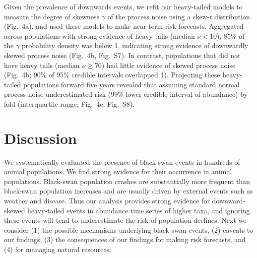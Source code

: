 \documentclass[9pt,twocolumn,twoside]{pnas-new}
\newcommand{\figskewnu}{{7}}
\newcommand{\figskewprojections}{{8}}
\begin{document}
Given the prevalence of downwards events, we refit our heavy-tailed models to
measure the degree of skewness \(\gamma\) of the process noise using a skew-$t$
distribution (Fig.~4a), and used these models to make near-term risk forecasts.
Aggregated across populations with strong evidence of heavy tails (median \(\nu
< 10\)), 85\% of the \(\gamma\) probability density was below 1, indicating
strong evidence of downwardly skewed process noise (Fig.~4b,
Fig.~S\figskewnu). In contrast, populations that did not have heavy
tails (median \(\nu \geq 70\)) had little evidence of skewed process noise
(Fig.~4b; 90\% of 95\% credible intervals overlapped 1). Projecting these
heavy-tailed populations forward five years revealed that assuming standard
normal process noise underestimated risk (99\% lower credible interval of
abundance) by \crashUnderRange-fold (interquartile range; Fig.~4c,
Fig.~S\figskewprojections).

\section*{Discussion}

We systematically evaluated the presence of black-swan events in hundreds of
animal populations.
We find strong evidence for their occurrence in animal populations. Black-swan
population crashes are substantially more frequent
than black-swan population
increases and are usually driven by external events such as weather and
disease.
Thus our analysis provides strong evidence
for downward-skewed heavy-tailed events in abundance time series of higher
taxa, and ignoring these events will tend to underestimate the risk of
population declines.
Next we consider
(1) the possible mechanisms underlying black-swan events,
(2) caveats to our findings,
(3) the consequences of our findings for making risk forecasts, and
(4) for managing natural resources.

\end{document}
